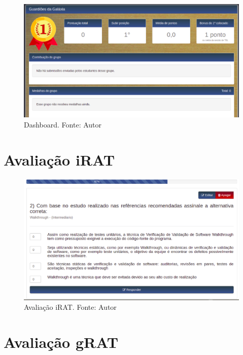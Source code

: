 \begin{apendicesenv}
\begin{figure}[h!]
	\centering
  \includegraphics[keepaspectratio=true,scale=0.57]{figuras/gamificacao.eps}
  \caption[Dashboard]{Dashboard. Fonte: Autor}
	\label{fig:dashboard}
\end{figure}

\section{Avaliação iRAT}

\begin{figure}[H]
	\centering
  \includegraphics[keepaspectratio=true,scale=0.42]{figuras/avaliacao.eps}
  \caption[Avaliação iRAT]{Avaliação iRAT. Fonte: Autor}
	\label{fig:irat}
\end{figure}

\section{Avaliação gRAT}


\end{apendicesenv}
